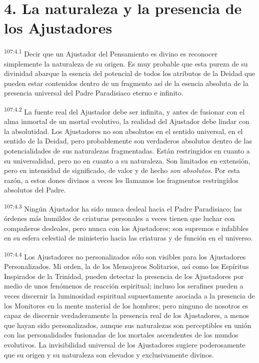 \documentclass[twoside, 11pt]{book}
\begin{document}
\section*{4. La naturaleza y la presencia de los Ajustadores}
\par
\textsuperscript{107:4.1} Decir que un Ajustador del Pensamiento es divino es reconocer simplemente la naturaleza de su origen. Es muy probable que esta pureza de su divinidad abarque la esencia del potencial de todos los atributos de la Deidad que pueden estar contenidos dentro de un fragmento así de la esencia absoluta de la presencia universal del Padre Paradisiaco eterno e infinito.

\par
\textsuperscript{107:4.2} La fuente real del Ajustador debe ser infinita, y antes de fusionar con el alma inmortal de un mortal evolutivo, la realidad del Ajustador debe lindar con la absolutidad. Los Ajustadores no son absolutos en el sentido universal, en el sentido de la Deidad, pero probablemente son verdaderos absolutos dentro de las potencialidades de sus naturalezas fragmentadas. Están restringidos en cuanto a su universalidad, pero no en cuanto a su naturaleza. Son limitados en extensión, pero en intensidad de significado, de valor y de hecho \textit{son absolutos}. Por esta razón, a estos dones divinos a veces les llamamos los fragmentos restringidos absolutos del Padre.

\par
\textsuperscript{107:4.3} Ningún Ajustador ha sido nunca desleal hacia el Padre Paradisiaco; las órdenes más humildes de criaturas personales a veces tienen que luchar con compañeros desleales, pero nunca con los Ajustadores; son supremos e infalibles en su esfera celestial de ministerio hacia las criaturas y de función en el universo.

\par
\textsuperscript{107:4.4} Los Ajustadores no personalizados sólo son visibles para los Ajustadores Personalizados. Mi orden, la de los Mensajeros Solitarios, así como los Espíritus Inspirados de la Trinidad, pueden detectar la presencia de los Ajustadores por medio de unos fenómenos de reacción espiritual; incluso los serafines pueden a veces discernir la luminosidad espiritual supuestamente asociada a la presencia de los Monitores en la mente material de los hombres; pero ninguno de nosotros es capaz de discernir verdaderamente la presencia real de los Ajustadores, a menos que hayan sido personalizados, aunque sus naturalezas son perceptibles en unión con las personalidades fusionadas de los mortales ascendentes de los mundos evolutivos. La invisibilidad universal de los Ajustadores sugiere poderosamente que su origen y su naturaleza son elevados y exclusivamente divinos.
\end{document}
